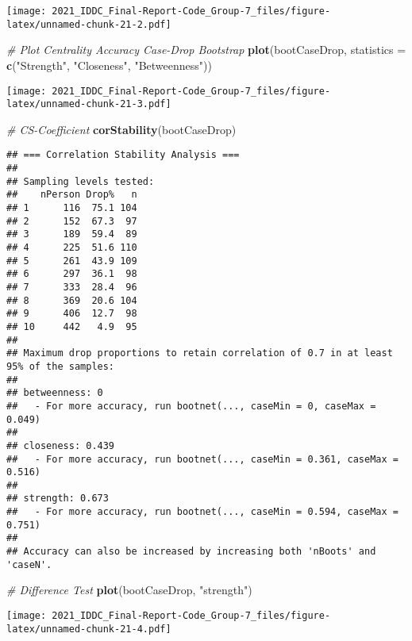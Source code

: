\documentclass[
]{article}
\newenvironment{Shaded}{\begin{snugshade}}{\end{snugshade}}
\newcommand{\CommentTok}[1]{\textcolor[rgb]{0.56,0.35,0.01}{\textit{#1}}}
\newcommand{\DataTypeTok}[1]{\textcolor[rgb]{0.13,0.29,0.53}{#1}}
\newcommand{\KeywordTok}[1]{\textcolor[rgb]{0.13,0.29,0.53}{\textbf{#1}}}
\newcommand{\NormalTok}[1]{#1}
\newcommand{\StringTok}[1]{\textcolor[rgb]{0.31,0.60,0.02}{#1}}
\begin{document}
\texttt{[image: 2021\_IDDC\_Final-Report-Code\_Group-7\_files/figure-latex/unnamed-chunk-21-2.pdf]}

\begin{Shaded}
\begin{Highlighting}[]
\CommentTok{# Plot Centrality Accuracy Case-Drop Bootstrap}
\KeywordTok{plot}\NormalTok{(bootCaseDrop,}
     \DataTypeTok{statistics =} \KeywordTok{c}\NormalTok{(}\StringTok{"Strength"}\NormalTok{, }\StringTok{"Closeness"}\NormalTok{, }\StringTok{"Betweenness"}\NormalTok{))}
\end{Highlighting}
\end{Shaded}

\texttt{[image: 2021\_IDDC\_Final-Report-Code\_Group-7\_files/figure-latex/unnamed-chunk-21-3.pdf]}

\begin{Shaded}
\begin{Highlighting}[]
\CommentTok{# CS-Coefficient}
\KeywordTok{corStability}\NormalTok{(bootCaseDrop)}
\end{Highlighting}
\end{Shaded}

\begin{verbatim}
## === Correlation Stability Analysis === 
## 
## Sampling levels tested:
##    nPerson Drop%   n
## 1      116  75.1 104
## 2      152  67.3  97
## 3      189  59.4  89
## 4      225  51.6 110
## 5      261  43.9 109
## 6      297  36.1  98
## 7      333  28.4  96
## 8      369  20.6 104
## 9      406  12.7  98
## 10     442   4.9  95
## 
## Maximum drop proportions to retain correlation of 0.7 in at least 95% of the samples:
## 
## betweenness: 0 
##   - For more accuracy, run bootnet(..., caseMin = 0, caseMax = 0.049) 
## 
## closeness: 0.439 
##   - For more accuracy, run bootnet(..., caseMin = 0.361, caseMax = 0.516) 
## 
## strength: 0.673 
##   - For more accuracy, run bootnet(..., caseMin = 0.594, caseMax = 0.751) 
## 
## Accuracy can also be increased by increasing both 'nBoots' and 'caseN'.
\end{verbatim}

\begin{Shaded}
\begin{Highlighting}[]
\CommentTok{# Difference Test}
\KeywordTok{plot}\NormalTok{(bootCaseDrop, }\StringTok{"strength"}\NormalTok{)}
\end{Highlighting}
\end{Shaded}

\texttt{[image: 2021\_IDDC\_Final-Report-Code\_Group-7\_files/figure-latex/unnamed-chunk-21-4.pdf]}
\end{document}
